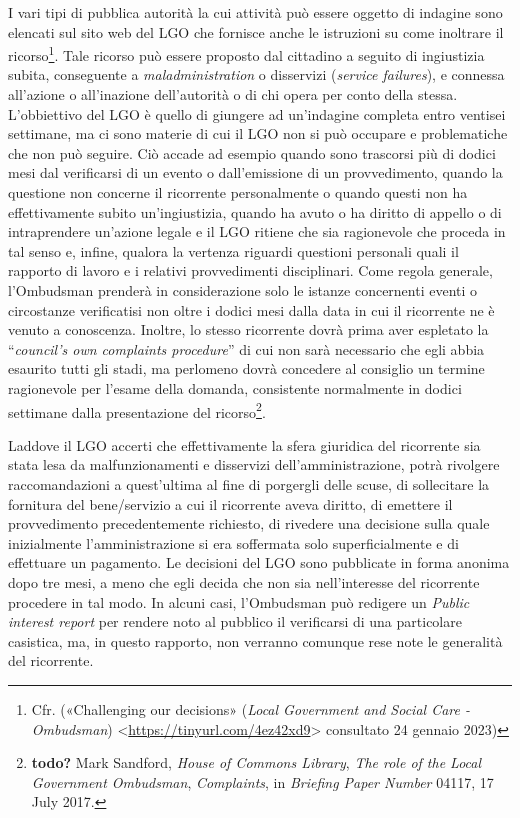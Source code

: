 \documentclass[12pt,it,a4paper,]{report}
\begin{document}
I vari tipi di pubblica autorità la cui attività può essere oggetto di
indagine sono elencati sul sito web del LGO che fornisce anche le
istruzioni su come inoltrare il ricorso\footnote{Cfr. ({«Challenging our
  decisions»} (\emph{Local Government and Social Care - Ombudsman})
  \textless{}\url{https://tinyurl.com/4ez42xd9}\textgreater{} consultato
  24 gennaio 2023)}. Tale ricorso può essere proposto dal cittadino a
seguito di ingiustizia subita, conseguente a \emph{maladministration} o
disservizi (\emph{service failures}), e connessa all'azione o
all'inazione dell'autorità o di chi opera per conto della stessa.
L'obbiettivo del LGO è quello di giungere ad un'indagine completa entro
ventisei settimane, ma ci sono materie di cui il LGO non si può occupare
e problematiche che non può seguire. Ciò accade ad esempio quando sono
trascorsi più di dodici mesi dal verificarsi di un evento o
dall'emissione di un provvedimento, quando la questione non concerne il
ricorrente personalmente o quando questi non ha effettivamente subito
un'ingiustizia, quando ha avuto o ha diritto di appello o di
intraprendere un'azione legale e il LGO ritiene che sia ragionevole che
proceda in tal senso e, infine, qualora la vertenza riguardi questioni
personali quali il rapporto di lavoro e i relativi provvedimenti
disciplinari. Come regola generale, l'Ombudsman prenderà in
considerazione solo le istanze concernenti eventi o circostanze
verificatisi non oltre i dodici mesi dalla data in cui il ricorrente ne
è venuto a conoscenza. Inoltre, lo stesso ricorrente dovrà prima aver
espletato la ``\emph{council's own complaints procedure}'' di cui non
sarà necessario che egli abbia esaurito tutti gli stadi, ma perlomeno
dovrà concedere al consiglio un termine ragionevole per l'esame della
domanda, consistente normalmente in dodici settimane dalla presentazione
del ricorso\footnote{\textbf{todo?} Mark Sandford, \emph{House of
  Commons Library}, \emph{The role of the Local Government Ombudsman},
  \emph{Complaints}, in \emph{Briefing Paper Number} 04117, 17 July
  2017.}.

Laddove il LGO accerti che effettivamente la sfera giuridica del
ricorrente sia stata lesa da malfunzionamenti e disservizi
dell'amministrazione, potrà rivolgere raccomandazioni a quest'ultima al
fine di porgergli delle scuse, di sollecitare la fornitura del
bene/servizio a cui il ricorrente aveva diritto, di emettere il
provvedimento precedentemente richiesto, di rivedere una decisione sulla
quale inizialmente l'amministrazione si era soffermata solo
superficialmente e di effettuare un pagamento. Le decisioni del LGO sono
pubblicate in forma anonima dopo tre mesi, a meno che egli decida che
non sia nell'interesse del ricorrente procedere in tal modo. In alcuni
casi, l'Ombudsman può redigere un \emph{Public interest report} per
rendere noto al pubblico il verificarsi di una particolare casistica,
ma, in questo rapporto, non verranno comunque rese note le generalità
del ricorrente.
\end{document}
